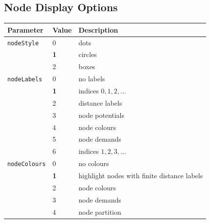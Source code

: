 \documentclass[a4paper,11pt,twoside]{book}
\begin{document}
\begin{multicols}{2}
\subsection{Node Display Options}
\label{slb_node_display}
\medskip
\begin{center}
\begin{tabular}{|p{2.5cm}|p{1.2cm}|p{8.0cm}|}
\hline
{\bf Parameter} & {\bf Value} & {\bf Description} \\
\hline
\hline
\verb/nodeStyle/    & 0 & dots \\
                    & {\bf 1} & circles \\
                    & 2 & boxes \\
\hline
\verb/nodeLabels/   & 0 & no labels \\
                    & {\bf 1} & indices $0,1,2,...$\\
                    & 2 & distance labels \\
                    & 3 & node potentials \\
                    & 4 & node colours \\
                    & 5 & node demands \\
                    & 6 & indices $1,2,3,...$ \\
\hline
\verb/nodeColours/  & 0 & no colours \\
                    & {\bf 1} & highlight nodes with finite distance labels \\
                    & 2 & node colours \\
                    & 3 & node demands \\
                    & 4 & node partition \\
\hline
\end{tabular}
\end{center}
\bigskip



\end{multicols}
\end{document}
